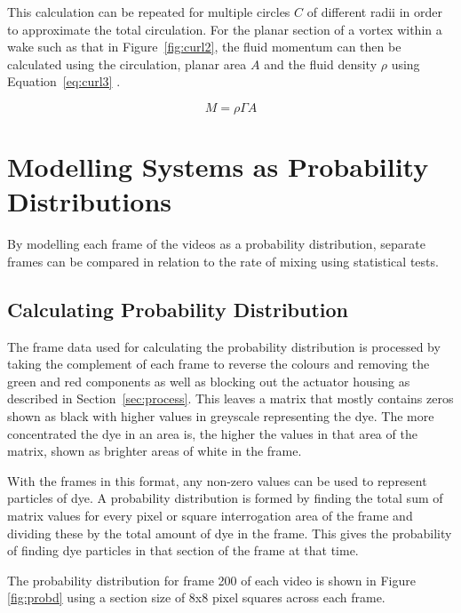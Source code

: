 This calculation can be repeated for multiple circles $C$ of different radii in order to approximate the total circulation. For the planar section of a vortex within a wake such as that in Figure~\ref{fig:curl2}, the fluid momentum can then be calculated using the circulation, planar area $A$ and the fluid density $\rho$ using Equation~\ref{eq:curl3} \cite{swimmingfish}.


\begin{equation}\label{eq:curl3}
M= \rho \Gamma A
\end{equation}
 





\section{Modelling Systems as Probability Distributions}
\label{sec:prob}

By modelling each frame of the videos as a probability distribution, separate frames can be compared in relation to the rate of mixing using statistical tests. 

\subsection{Calculating Probability Distribution}

The frame data used for calculating the probability distribution is processed by taking the complement of each frame to reverse the colours and removing the green and red components as well as blocking out the actuator housing as described in Section~\ref{sec:process}.  This leaves a matrix that mostly contains zeros shown as black with higher values in greyscale representing the dye. The more concentrated the dye in an area is, the higher the values in that area of the matrix, shown as brighter areas of white in the frame.

With the frames in this format, any non-zero values can be used to represent particles of dye. A probability distribution is formed by finding the total sum of matrix values for every pixel or square interrogation area of the frame and dividing these by the total amount of dye in the frame. This gives the probability of finding dye particles in that section of the frame at that time. 

The probability distribution for frame 200 of each video is shown in Figure \ref{fig:probd} using a section size of 8x8 pixel squares across each frame.

